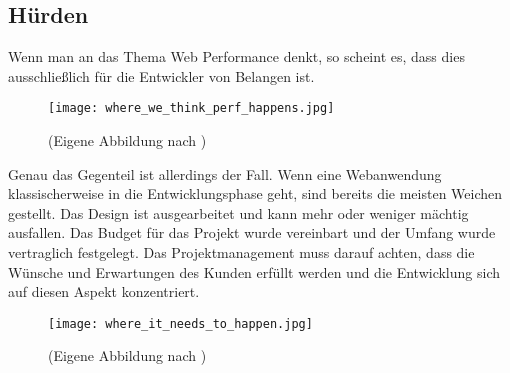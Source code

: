 	\subsection{Hürden} %
	\label{sub:hürden}
	
	Wenn man an das Thema Web Performance denkt, so scheint es, dass dies ausschließlich für die Entwickler von Belangen ist.
	
	\begin{figure}[htbp]
		\begin{center}
			\texttt{[image: where\_we\_think\_perf\_happens.jpg]}
			\caption{(Eigene Abbildung nach \autocite[p. 10]{kovalcin15})}
			\label{fig:where_we_think_perf_happens}
		\end{center}
	\end{figure}

	Genau das Gegenteil ist allerdings der Fall. Wenn eine Webanwendung klassischerweise in die Entwicklungsphase geht, sind bereits die meisten Weichen gestellt. Das Design ist ausgearbeitet und kann mehr oder weniger mächtig ausfallen. Das Budget für das Projekt wurde vereinbart und der Umfang wurde vertraglich festgelegt. Das Projektmanagement muss darauf achten, dass die Wünsche und Erwartungen des Kunden erfüllt werden und die Entwicklung sich auf diesen Aspekt konzentriert.

	\begin{figure}[htbp]
		\begin{center}
			\texttt{[image: where\_it\_needs\_to\_happen.jpg]}
			\caption{(Eigene Abbildung nach \autocite[p. 11]{kovalcin15})}
			\label{fig:where_it_needs_to_happen}
		\end{center}
	\end{figure}

